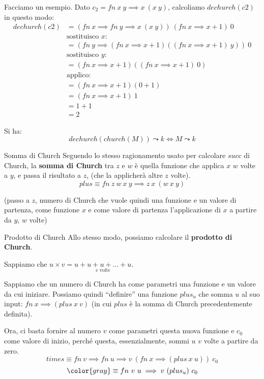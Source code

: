 \documentclass[a4paper,11pt]{report}
\begin{document}
Facciamo un esempio. Dato \( c_2 = fn \ x \ y \implies x \ (x \ y ) \), calcoliamo \( dechurch(c2) \) in questo modo:
\begin{align*}
    dechurch(c2) &= (fn\ x \implies fn \ y \implies x \ (x \ y)) \ (fn \ x \implies x+1) \ 0 \\
    & \text{sostituisco } x: \\
    &= (fn\ y \implies (fn\ x \implies x+1) ((fn\ x \implies x+1) \ y)) \ 0 \\
    & \text{sostituisco } y: \\
    &= (fn\ x \implies x+1) ((fn\ x \implies x+1) \ 0) \\
    & \text{applico:} \\
    &= (fn\ x \implies x+1) (0+1) \\
    &= (fn\ x \implies x+1) \ 1 \\
    &= 1+1 \\
    &= 2
\end{align*}

\begin{thmbox}{}{}
    Si ha:
    \[ dechurch(church(M)) \leadsto k \iff M \leadsto k \]
\end{thmbox}

\begin{defbox}{Somma di Church}{}
    Seguendo lo stesso ragionamento usato per calcolare \( succ \) di Church, la \textbf{somma di Church} tra \( z\) e \( w \) è quella funzione che applica \( x\) \( w\) volte a \( y \), e passa il risultato a \( z \), (che la applicherà altre \( z \) volte).
    \[ plus \equiv fn \ z \ w \ x \ y \implies z \ x \ (w \ x \ y)\]

    (passo a \( z \), numero di Church che vuole quindi una funzione e un valore di partenza, come funzione \( x \) e come valore di partenza l'applicazione di \( x \) a partire da \( y \), \( w \) volte)

\end{defbox}

\begin{defbox}{Prodotto di Church}{}
    Allo stesso modo, possiamo calcolare il \textbf{prodotto di Church}.

    Sappiamo che \( u \times v = \underset{v \text{ volte}}{u + u + u + ... + u} \).

    Sappiamo che un numero di Church ha come parametri una funzione e un valore da cui iniziare. Possiamo quindi ``definire'' una funzione \( plus_u \) che somma \( u \) al suo input: \( fn \ x \implies (plus \ x \ v) \) (in cui \( plus \) è la somma di Church precedentemente definita).

    Ora, ci basta fornire al numero \( v \) come parametri questa nuova funzione e \( c_0 \) come valore di inizio, perché questa, essenzialmente, sommi \( u \) \( v \) volte a partire da zero.
    \[ times \equiv fn \ v \implies fn \ u \implies v \ (fn \ x \implies (plus \ x \ u) ) \ c_0 \]
    \[\color{gray} \equiv fn \ v  \ u \implies v \ (plus_u)  \ c_0 \]
    
\end{defbox}
\end{document}
